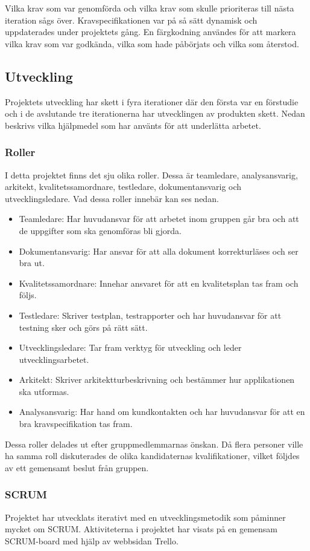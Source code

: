 \documentclass{article}
\begin{document}
Vilka krav som var genomförda och vilka krav som skulle prioriteras till nästa iteration sågs över. Kravspecifikationen var på så sätt dynamisk och uppdaterades under projektets gång. En färgkodning användes för att markera vilka krav som var godkända, vilka som hade påbörjats och vilka som återstod.

\subsection{Utveckling}
Projektets utveckling har skett i fyra iterationer där den första var en förstudie och i de avslutande tre iterationerna har utvecklingen av produkten skett. Nedan beskrivs vilka hjälpmedel som har använts för att underlätta arbetet.

\subsubsection{Roller}
I detta projektet finns det sju olika roller. Dessa är teamledare, analysansvarig, arkitekt, kvalitetssamordnare, testledare, dokumentansvarig och utvecklingsledare. Vad dessa roller innebär kan ses nedan. 
\begin{itemize}
\item Teamledare: Har huvudansvar för att arbetet inom gruppen går bra och att de uppgifter som ska genomföras bli gjorda. 
\item Dokumentansvarig: Har ansvar för att alla dokument korrekturläses och ser bra ut. 
\item Kvalitetssamordnare: Innehar ansvaret för att en kvalitetsplan tas fram och följs. 
\item Testledare: Skriver testplan, testrapporter och har huvudansvar för att testning sker och görs på rätt sätt.
\item Utvecklingsledare: Tar fram verktyg för utveckling och leder utvecklingsarbetet.
\item Arkitekt: Skriver arkitektturbeskrivning och bestämmer hur applikationen ska utformas.
\item Analysansvarig: Har hand om kundkontakten och har huvudansvar för att en bra kravspecifikation tas fram.
\end{itemize}
Dessa roller delades ut efter gruppmedlemmarnas önskan. Då flera personer ville ha samma roll diskuterades de olika kandidaternas kvalifikationer, vilket följdes av ett gemensamt beslut från gruppen.

\subsubsection{SCRUM}
Projektet har utvecklats iterativt med en utvecklingsmetodik som påminner mycket om SCRUM. Aktiviteterna i projektet har visats på en gemensam SCRUM-board med hjälp av webbsidan Trello. 
\end{document}

